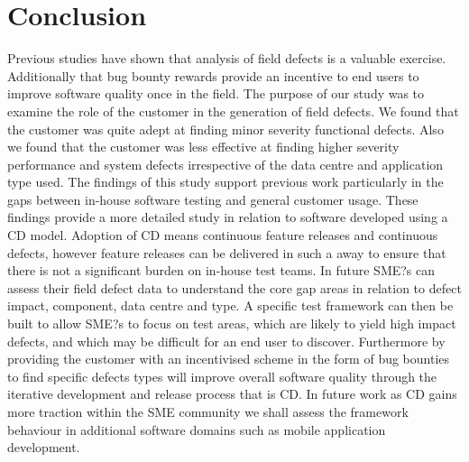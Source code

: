 \documentclass[conference]{IEEEtran}
\begin{document}



\section{Conclusion}
Previous studies have shown that analysis of field defects is a valuable exercise. Additionally that bug bounty rewards provide an incentive to end users to improve software quality once in the field. The purpose of our study was to examine the role of the customer in the generation of field defects. We found that the customer was quite adept at finding minor severity functional defects. Also we found that the customer was less effective at finding higher severity performance and system defects irrespective of the data centre and application type used. The findings of this study support previous work particularly in the gaps between in-house software testing and general customer usage.
These findings provide a more detailed study in relation to software developed using a CD model. Adoption of CD means continuous feature releases and continuous defects, however feature releases can be delivered in such a away to ensure that there is not a significant burden on in-house test teams. 
 In future SME?s can assess their field defect data to understand the core gap areas in relation to defect impact, component, data centre and type. A specific test framework can then be built to allow SME?s to focus on test areas, which are likely to yield high impact defects, and which may be difficult for an end user to discover. 
Furthermore by providing the customer with an incentivised scheme in the form of bug bounties to find specific defects types will improve overall software quality through the iterative development and release process that is CD. 
In future work as CD gains more traction within the SME community we shall assess the framework behaviour in additional software domains such as mobile application development. 






\end{document}
